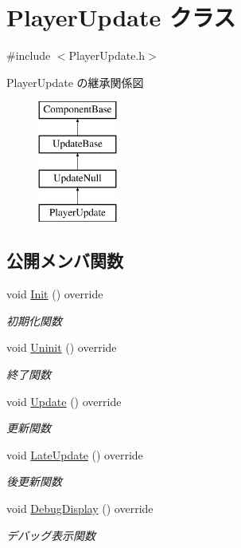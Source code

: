 \hypertarget{class_player_update}{}\section{Player\+Update クラス}
\label{class_player_update}


{\ttfamily \#include $<$Player\+Update.\+h$>$}

Player\+Update の継承関係図\begin{figure}[H]
\begin{center}
\leavevmode
\includegraphics[height=4.000000cm]{class_player_update}
\end{center}
\end{figure}
\subsection*{公開メンバ関数}
\begin{DoxyCompactItemize}
\item 
void \mbox{\hyperlink{class_player_update_ac72b39db7b7bfaf094bde9ed1adef4b7}{Init}} () override
\begin{DoxyCompactList}\small\item\em 初期化関数 \end{DoxyCompactList}\item 
void \mbox{\hyperlink{class_player_update_a997e0813a825d7525da4b5b89a290168}{Uninit}} () override
\begin{DoxyCompactList}\small\item\em 終了関数 \end{DoxyCompactList}\item 
void \mbox{\hyperlink{class_player_update_af6e1b8ca60399f232e64d2acb4968c75}{Update}} () override
\begin{DoxyCompactList}\small\item\em 更新関数 \end{DoxyCompactList}\item 
void \mbox{\hyperlink{class_player_update_ae376f517f3458edfef61ac366aa78e36}{Late\+Update}} () override
\begin{DoxyCompactList}\small\item\em 後更新関数 \end{DoxyCompactList}\item 
void \mbox{\hyperlink{class_player_update_ac15fd0faf356c6e66f6c62c2b6b8d3ac}{Debug\+Display}} () override
\begin{DoxyCompactList}\small\item\em デバッグ表示関数 \end{DoxyCompactList}\end{DoxyCompactItemize}


